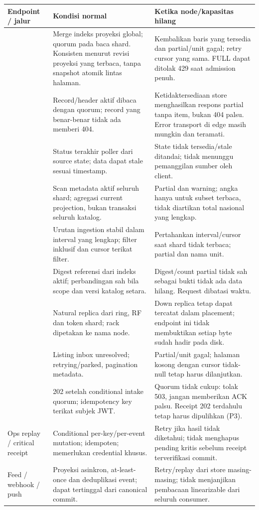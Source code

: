\begin{longtable}{@{}P{4.1cm}P{5.4cm}P{6cm}@{}}
\toprule Endpoint / jalur & Kondisi normal & Ketika node/kapasitas hilang\\\midrule\endhead
{} & Merge indeks proyeksi global; quorum pada baca shard. Konsisten menurut revisi proyeksi yang terbaca, tanpa snapshot atomik lintas halaman. & Kembalikan baris yang tersedia dan partial/unit gagal; retry cursor yang sama. FULL dapat ditolak 429 saat admission penuh.\\
 & Record/header aktif dibaca dengan quorum; record yang benar-benar tidak ada memberi 404. & Ketidaktersediaan store menghasilkan respons partial tanpa item, bukan 404 palsu. Error transport di edge masih mungkin dan teramati.\\
 & Status terakhir poller dari source state; data dapat stale sesuai timestamp. & State tidak tersedia/stale ditandai; tidak menunggu pemanggilan sumber oleh client.\\
 & Scan metadata aktif seluruh shard; agregasi current projection, bukan transaksi seluruh katalog. & Partial dan warning; angka hanya untuk subset terbaca, tidak diartikan total nasional yang lengkap.\\
 & Urutan ingestion stabil dalam interval yang lengkap; filter  inklusif dan cursor terikat filter. & Pertahankan interval/cursor saat shard tidak terbaca; partial dan nama unit.\\
 & Digest referensi dari indeks aktif; perbandingan sah bila scope dan versi katalog setara. & Digest/count partial tidak sah sebagai bukti tidak ada data hilang. Request dibatasi waktu.\\
 & Natural replica dari ring, RF dan token shard; rack dipetakan ke nama node. & Down replica tetap dapat tercatat dalam placement; endpoint ini tidak membuktikan setiap byte sudah hadir pada disk.\\
 & Listing inbox unresolved; retrying/parked, pagination metadata. & Partial/unit gagal; halaman kosong dengan cursor tidak-null tetap harus dilanjutkan.\\
 & 202 setelah conditional intake quorum; idempotency key terikat subjek JWT. & Quorum tidak cukup: tolak 503, jangan memberikan ACK palsu. Receipt 202 terdahulu tetap harus dipulihkan (P3).\\
Ops replay / critical receipt & Conditional per-key/per-event mutation; idempoten; memerlukan credential khusus. & Retry jika hasil tidak diketahui; tidak menghapus pending kritis sebelum receipt terverifikasi commit.\\
Feed / webhook / push & Proyeksi asinkron, at-least-once dan deduplikasi event; dapat tertinggal dari canonical commit. & Retry/replay dari store masing-masing; tidak menjanjikan pembacaan linearizable dari seluruh consumer.\\\bottomrule
\end{longtable}

